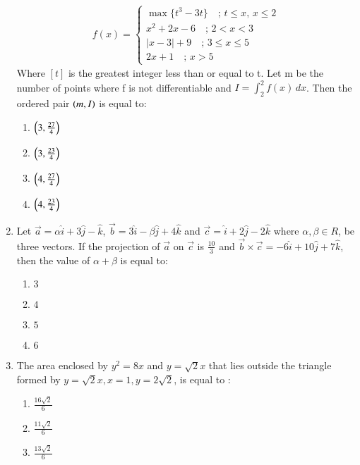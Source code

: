 \documentclass[journal,12pt,twocolumn]{IEEEtran}
\theoremstyle{remark}
\begin{document}
\begin{enumerate}
\begin{align*}
f(x) =
\begin{cases}
\max \{ t^3 - 3t \} \quad ; \, t \leq x, \, x \leq 2 \\
x^2 + 2x - 6 \quad ; \, 2 < x < 3 \\
|x - 3| + 9 \quad ; \, 3 \leq x \leq 5 \\
2x + 1 \quad ; \, x > 5
\end{cases}
\end{align*} 
Where $[t]$ is the greatest integer less than or equal to t. Let m be the number of points where f is not differentiable and $I = \int_{2}^{2} f(x) \, dx$. Then the ordered pair $\left(m,I\right)$ is equal to:
\begin{multicols}{2}
\begin{enumerate}
    \item $\left(3,\frac{27}{4}\right)$
    \item $\left(3,\frac{23}{4}\right)$
    \item $\left(4,\frac{27}{4}\right)$
    \item $\left(4,\frac{23}{4}\right)$
\end{enumerate}
\end{multicols}
\bigskip
\item Let $\vec{a}=\alpha \hat{i}+3\hat{j}-\hat{k}$, $\vec{b}=3\hat{i}-\beta\hat{j}+4\hat{k}$ and $\vec{c}=\hat{i}+2\hat{j}-2\hat{k}$ where $\alpha,\beta \in R$, be three vectors. If the projection of $\vec{a}$ on $\vec{c}$ is $\frac{10}{3}$ and $\vec{b}\times \vec{c}=-6\hat{i}+10\hat{j}+7\hat{k}$, then the value of $\alpha+\beta$ is equal to:
\begin{multicols}{2}
\begin{enumerate}
    \item $3$
    \item $4$
    \item $5$
    \item $6$
\end{enumerate}
\end{multicols}
\bigskip
\item The area enclosed by $y^2=8x$ and $y=\sqrt{2}x$ that lies outside the triangle formed by $y=\sqrt{2}x,x=1,y=2\sqrt{2}$, is equal to :
\begin{multicols}{2}
\begin{enumerate}
    \item $\frac{16\sqrt{2}}{6}$
    \item $\frac{11\sqrt{2}}{6}$
    \item $\frac{13\sqrt{2}}{6}$

\end{enumerate}
\end{multicols}
\end{enumerate}
\end{document}
